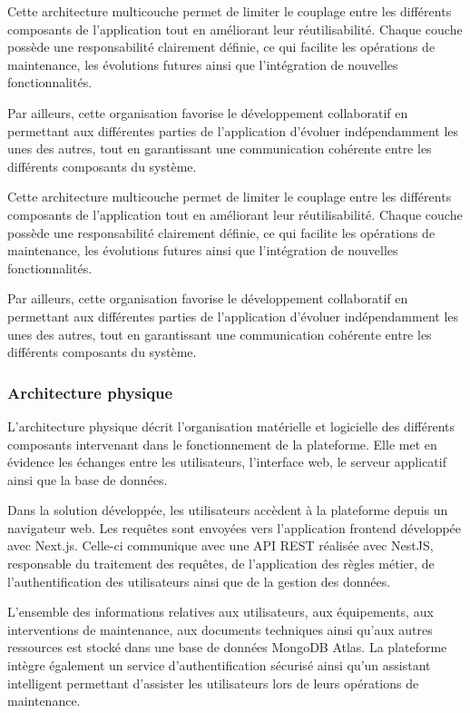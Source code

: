 Cette architecture multicouche permet de limiter le couplage entre les différents composants de l'application tout en améliorant leur réutilisabilité. Chaque couche possède une responsabilité clairement définie, ce qui facilite les opérations de maintenance, les évolutions futures ainsi que l'intégration de nouvelles fonctionnalités.

Par ailleurs, cette organisation favorise le développement collaboratif en permettant aux différentes parties de l'application d'évoluer indépendamment les unes des autres, tout en garantissant une communication cohérente entre les différents composants du système.

Cette architecture multicouche permet de limiter le couplage entre les différents composants de l'application tout en améliorant leur réutilisabilité. Chaque couche possède une responsabilité clairement définie, ce qui facilite les opérations de maintenance, les évolutions futures ainsi que l'intégration de nouvelles fonctionnalités.

Par ailleurs, cette organisation favorise le développement collaboratif en permettant aux différentes parties de l'application d'évoluer indépendamment les unes des autres, tout en garantissant une communication cohérente entre les différents composants du système.

\subsubsection{Architecture physique}

L'architecture physique décrit l'organisation matérielle et logicielle des différents composants intervenant dans le fonctionnement de la plateforme. Elle met en évidence les échanges entre les utilisateurs, l'interface web, le serveur applicatif ainsi que la base de données.

Dans la solution développée, les utilisateurs accèdent à la plateforme depuis un navigateur web. Les requêtes sont envoyées vers l'application frontend développée avec Next.js. Celle-ci communique avec une API REST réalisée avec NestJS, responsable du traitement des requêtes, de l'application des règles métier, de l'authentification des utilisateurs ainsi que de la gestion des données.

L'ensemble des informations relatives aux utilisateurs, aux équipements, aux interventions de maintenance, aux documents techniques ainsi qu'aux autres ressources est stocké dans une base de données MongoDB Atlas. La plateforme intègre également un service d'authentification sécurisé ainsi qu'un assistant intelligent permettant d'assister les utilisateurs lors de leurs opérations de maintenance.

